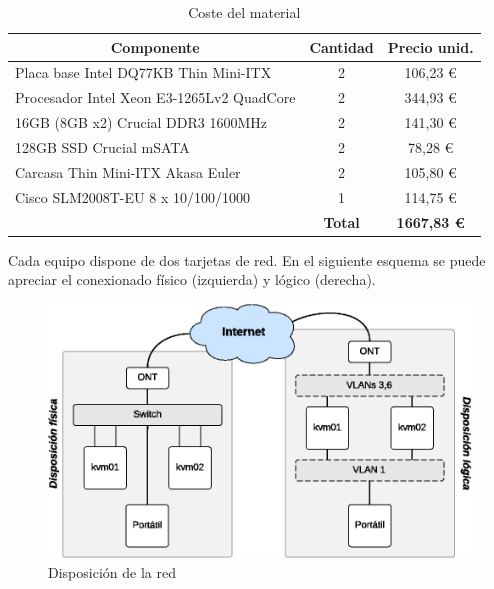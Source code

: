 \documentclass[a4paper,12pt,spanish,final]{epsc_tfc_pfc}
\begin{document}
\begin{table}[h]
  \centering
  \begin{tabular}{l|c|c|}
    \hline
    \multicolumn{1}{|c|}{\textbf{Componente}}                       & \textbf{Cantidad} & \textbf{Precio unid.}  \\ \hline
    \multicolumn{1}{|l|}{Placa base Intel DQ77KB Thin Mini-ITX}     & 2                 & 106,23 \euro           \\ \hline
    \multicolumn{1}{|l|}{Procesador Intel Xeon E3-1265Lv2 QuadCore} & 2                 & 344,93 \euro           \\ \hline
    \multicolumn{1}{|l|}{16GB (8GB x2) Crucial DDR3 1600MHz}        & 2                 & 141,30 \euro           \\ \hline
    \multicolumn{1}{|l|}{128GB SSD Crucial mSATA}                   & 2                 & 78,28 \euro            \\ \hline
    \multicolumn{1}{|l|}{Carcasa Thin Mini-ITX Akasa Euler}         & 2                 & 105,80 \euro           \\ \hline
    \multicolumn{1}{|l|}{Cisco SLM2008T-EU 8 x 10/100/1000}         & 1                 & 114,75 \euro           \\ \hline
                                                                    & \textbf{Total}    & \textbf{1667,83 \euro} \\ \cline{2-3}
  \end{tabular}
  \caption{Coste del material}
\end{table}

Cada equipo dispone de dos tarjetas de red. En el siguiente esquema se puede apreciar el conexionado físico (izquierda) y lógico (derecha).\\

\begin{figure}[h]
  \centering
    \includegraphics[scale=1]{layout}
      \caption{Disposición de la red}
\end{figure}
\end{document}
